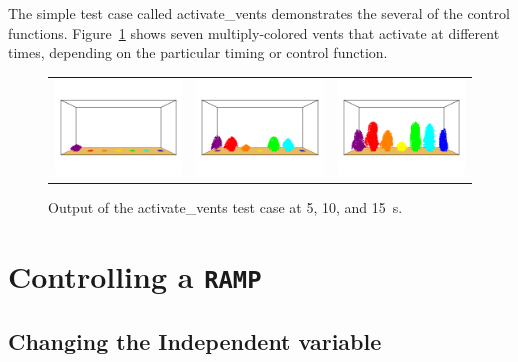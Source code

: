 \documentclass[11pt]{book}
\begin{document}
The simple test case called {\ct activate\_vents} demonstrates the several of the control functions. Figure~\ref{activate_vents} shows seven
multiply-colored vents that activate at different times, depending on the particular timing or control function.
\begin{figure}[ht]
\begin{tabular*}{\textwidth}{lll}
\includegraphics[width=2.05in]{SCRIPT_FIGURES/activate_vents_5} &
\includegraphics[width=2.05in]{SCRIPT_FIGURES/activate_vents_10} &
\includegraphics[width=2.05in]{SCRIPT_FIGURES/activate_vents_15}
\end{tabular*}
\caption[Snapshots of the {\ct activate\_vents} test case]{Output of the {\ct activate\_vents} test case at 5, 10, and 15~s.}
\label{activate_vents}
\end{figure}




\section{Controlling a \texorpdfstring{{\tt RAMP}}{RAMP}}

\subsection{Changing the Independent variable}
\label{info:RAMPDEVC}
\end{document}
